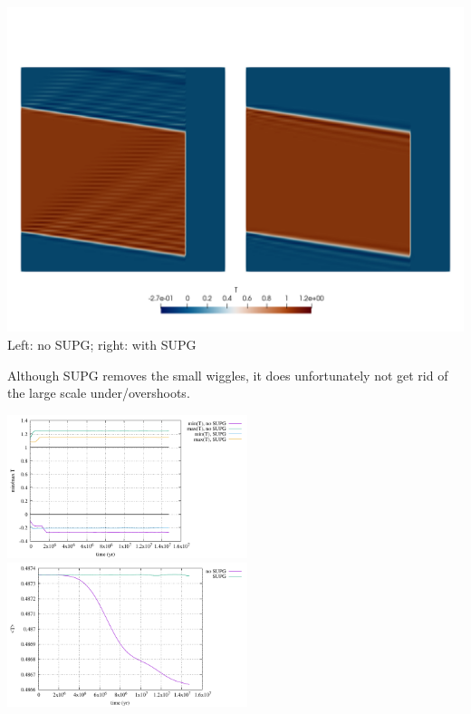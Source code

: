\begin{center}
\includegraphics[width=14cm]{python_codes/fieldstone_43/results/experiment6/T}\\
{\captionfont Left: no SUPG; right: with SUPG}
\end{center}

Although SUPG removes the small wiggles, it does unfortunately not get rid of the 
large scale under/overshoots. 

\begin{center}
\includegraphics[width=7cm]{python_codes/fieldstone_43/results/experiment6/stats_T}
\includegraphics[width=7cm]{python_codes/fieldstone_43/results/experiment6/avrg_T}
\end{center}

